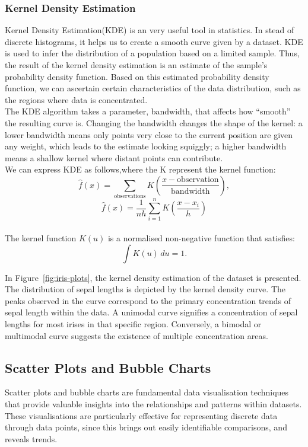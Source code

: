 \documentclass{article}\usepackage[]{graphicx}\usepackage[]{xcolor}
\begin{document}
\subsubsection{Kernel Density Estimation}

Kernel Density Estimation(KDE) is an very useful tool in statistics. In stead of discrete histograms, it helps us to create a smooth curve given by a dataset. KDE is used to infer the distribution of a population based on a limited sample. Thus, the result of the kernel density estimation is an estimate of the sample's probability density function. Based on this estimated probability density function, we can ascertain certain characteristics of the data distribution, such as the regions where data is concentrated.\\

\noindent
The KDE algorithm takes a parameter, bandwidth, that affects how “smooth” the resulting curve is. Changing the bandwidth changes the shape of the kernel: a lower bandwidth means only points very close to the current position are given any weight, which leads to the estimate looking squiggly; a higher bandwidth means a shallow kernel where distant points can contribute.\\

\noindent
We can express KDE as follows,where the K represent the kernel function:
$$\hat{f}(x) = \sum_{\text{observations}} K\left(\frac{x - \text{observation}}{\text{bandwidth}}\right),$$
$$\hat{f}(x) = \frac{1}{nh} \sum_{i=1}^{n} K\left(\frac{x - x_i}{h}\right)$$\\
The kernel function \( K(u) \) is a normalised non-negative function that satisfies:
\[ \int K(u) \, du = 1. \]

\noindent In Figure~\ref{fig:iris-plots}, the kernel density estimation of the dataset is presented. The distribution of sepal lengths is depicted by the kernel density curve. The peaks observed in the curve correspond to the primary concentration trends of sepal length within the data. A unimodal curve signifies a concentration of sepal lengths for most irises in that specific region. Conversely, a bimodal or multimodal curve suggests the existence of multiple concentration areas.

\subsection{Scatter Plots and Bubble Charts}

Scatter plots and bubble charts are fundamental data visualisation techniques that provide valuable insights into the relationships and patterns within datasets. These visualisations are particularly effective for representing discrete data through data points, since this brings out easily identifiable comparisons, and reveals trends.
\end{document}
